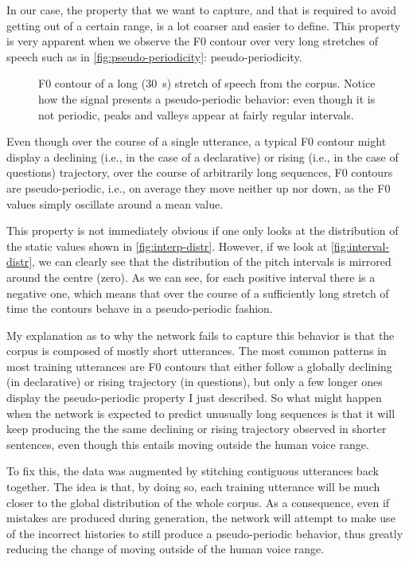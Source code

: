 In our case, the property that we want to capture, and that is required to avoid getting out of a certain range, is a lot coarser and easier to define.
This property is very apparent when we observe the \ac{F0} contour over very long stretches of speech such as in \autoref{fig:pseudo-periodicity}: pseudo-periodicity.

\begin{figure}[h]
\centering
\resizebox{\textwidth}{!}{}
\caption[Pseudo-periodicity of long contours]{\ac{F0} contour of a long (30~s) stretch of speech from the corpus. Notice how the signal presents a pseudo-periodic behavior: even though it is not periodic, peaks and valleys appear at fairly regular intervals.}
\label{fig:pseudo-periodicity}
\end{figure}

Even though over the course of a single utterance, a typical \ac{F0} contour might display a declining (i.e., in the case of a declarative) or rising (i.e., in the case of questions) trajectory, over the course of arbitrarily long sequences, \ac{F0} contours are pseudo-periodic, i.e., on average they move neither up nor down, as the \ac{F0} values simply oscillate around a mean value.

This property is not immediately obvious if one only looks at the distribution of the static values shown in \autoref{fig:interp-distr}.
However, if we look at \autoref{fig:interval-distr}, we can clearly see that the distribution of the pitch intervals is mirrored around the centre (zero).
As we can see, for each positive interval there is a negative one, which means that over the course of a sufficiently long stretch of time the contours behave in a pseudo-periodic fashion.

My explanation as to why the network fails to capture this behavior is that the corpus is composed of mostly short utterances.
The most common patterns in most training utterances are \ac{F0} contours that either follow a globally declining (in declarative) or rising trajectory (in questions), but only a few longer ones display the pseudo-periodic property I just described.
So what might happen when the network is expected to predict unusually long sequences is that it will keep producing the the same declining or rising trajectory observed in shorter sentences, even though this entails moving outside the human voice range.

To fix this, the data was augmented by stitching contiguous utterances back together.
The idea is that, by doing so, each training utterance will be much closer to the global distribution of the whole corpus.
As a consequence, even if mistakes are produced during generation, the network will attempt to make use of the incorrect histories to still produce a pseudo-periodic behavior, thus greatly reducing the change of moving outside of the human voice range.

